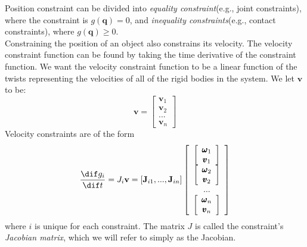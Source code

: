         Position constraint can be divided into \textit{equality constraint}(e.g., joint constraints), where the constraint is $g(\pmb{q}) = 0$, and \textit{inequality constraints}(e.g., contact constraints), where $g(\pmb{q}) \ge 0$. \\

        Constraining the position of an object also constrains its velocity. The velocity constraint function can be found by taking the time derivative of the constraint function. We want the velocity constraint function to be a linear function of the twists representing the velocities of all of the rigid bodies in the system. We let $\mathbf{v}$ to be:
        \begin{equation}
            \mathbf{v} = \left[ \begin{array}{c}\mathbf{v}_1 \\\mathbf{v}_2 \\ ... \\ \mathbf{v}_n \end{array}\right]
        \end{equation}
        Velocity constraints are of the form
        \begin{equation}
            \frac{\dif g_i}{\dif t} = J_i \mathbf{v} = [\mathbf{J}_{i1} ,...,\mathbf{J}_{in} ]\left[\begin{array}{c}\left[\begin{array}{c}\pmb{\omega}_1 \\ \pmb{v}_1\end{array}\right] \\ \left[\begin{array}{c}\pmb{\omega}_2 \\ \pmb{v}_2\end{array}\right] \\ ... \\ \left[\begin{array}{c}\pmb{\omega}_n \\ \pmb{v}_n\end{array}\right]\end{array}\right]
        \end{equation}
        where $i$ is unique for each constraint. The matrix $J$ is called the constraint's \textit{Jacobian matrix}, which we will refer to simply as the Jacobian. \\

